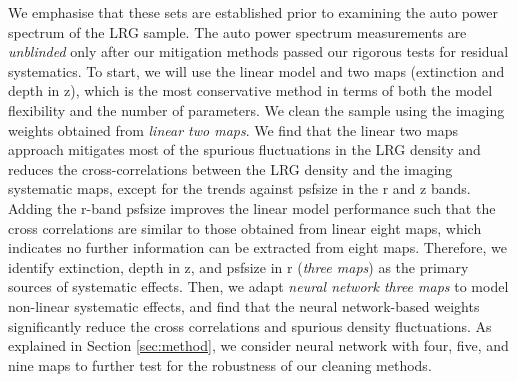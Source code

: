  We emphasise that these sets are established prior to examining the auto power spectrum of the LRG sample. The auto power spectrum measurements are \textit{unblinded} only after our mitigation methods passed our rigorous tests for residual systematics. To start, we will use the linear model and two maps (extinction and depth in z), which is the most conservative method in terms of both the model flexibility and the number of parameters. We clean the sample using the imaging weights obtained from \textit{linear two maps}. We find that the linear two maps approach mitigates most of the spurious fluctuations in the LRG density and reduces the cross-correlations between the LRG density and the imaging systematic maps, except for the trends against psfsize in the r and z bands. Adding the r-band psfsize improves the linear model performance such that the cross correlations are similar to those obtained from linear eight maps, which indicates no further information can be extracted from eight maps. Therefore, we identify extinction, depth in z, and psfsize in r (\textit{three maps}) as the primary sources of systematic effects. Then, we adapt \textit{neural network three maps} to model non-linear systematic effects, and find that the neural network-based weights significantly reduce the cross correlations and spurious density fluctuations. As explained in Section \ref{sec:method}, we consider neural network with four, five, and nine maps to further test for the robustness of our cleaning methods.


